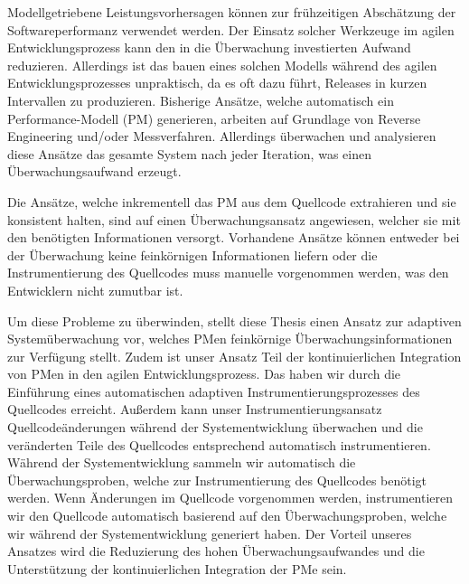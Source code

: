\Abstract
 
Modellgetriebene Leistungsvorhersagen können zur frühzeitigen Abschätzung der	
Softwareperformanz verwendet werden. Der Einsatz solcher Werkzeuge	im	agilen	
Entwicklungsprozess	kann	den	in	die	Überwachung	investierten	Aufwand	reduzieren.	
Allerdings	ist	das	bauen	eines	solchen	Modells	während	des	agilen	Entwicklungsprozesses	
unpraktisch,	da	es	oft	dazu	führt,	Releases	in	kurzen	Intervallen	zu	produzieren.	Bisherige	
Ansätze,	welche	automatisch	ein	Performance-Modell	(PM)	generieren,	arbeiten	auf	
Grundlage	von	Reverse	Engineering	und/oder	Messverfahren.	Allerdings	überwachen	und	
analysieren	diese	Ansätze	das	gesamte	System	nach	jeder	Iteration,	was	einen	
Überwachungsaufwand	erzeugt.

Die	Ansätze,	welche	inkrementell	das	PM	aus	dem	Quellcode	extrahieren	und	sie	konsistent	
halten,	sind	auf	einen	Überwachungsansatz	angewiesen,	welcher	sie	mit	den	benötigten	
Informationen	versorgt.	Vorhandene	Ansätze	können	entweder	bei	der	Überwachung	keine	
feinkörnigen	Informationen	liefern	oder	die	Instrumentierung	des	Quellcodes	muss	
manuelle	vorgenommen	werden,	was	den	Entwicklern	nicht	zumutbar	ist.

Um	diese	Probleme	zu	überwinden,	stellt	diese	Thesis	einen	Ansatz	zur	adaptiven	
Systemüberwachung	vor,	welches	PMen	feinkörnige	Überwachungsinformationen	zur	
Verfügung	stellt.	Zudem	ist	unser	Ansatz	Teil	der	kontinuierlichen	Integration	von	PMen	in	
den	agilen	Entwicklungsprozess.	Das	haben	wir	durch	die	Einführung	eines	automatischen	
adaptiven	Instrumentierungsprozesses	des	Quellcodes	erreicht.	Außerdem	kann	unser	
Instrumentierungsansatz	Quellcodeänderungen	während	der	Systementwicklung	
überwachen	und	die	veränderten	Teile	des	Quellcodes	entsprechend	automatisch	
instrumentieren.	Während	der	Systementwicklung	sammeln	wir	automatisch	die	
Überwachungsproben,	welche	zur	Instrumentierung	des	Quellcodes	benötigt	werden.	Wenn	
Änderungen	im	Quellcode	vorgenommen	werden,	instrumentieren	wir	den	Quellcode	
automatisch	basierend	auf	den	Überwachungsproben,	welche	wir	während	der	
Systementwicklung	generiert	haben.	Der	Vorteil	unseres	Ansatzes	wird	die Reduzierung	des	
hohen	Überwachungsaufwandes	und	die	Unterstützung	der	kontinuierlichen	Integration	der	
PMe	sein.

